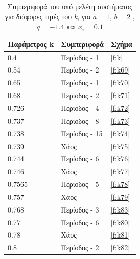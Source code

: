 \begin{table}[ht]
	\centering
	\caption{ Συμπεριφορά του υπό μελέτη συστήματος για διάφορες τιμές του \emph{k}, για $a = 1$, $b = 2$ , $q=-1.4$ και
		\(x_i=0.1\)}
	\label{tab:abc6}
	\begin{tabular}{l | l | l}
		Παράμετρος k & Συμπεριφορά & Σχήμα\\
		\hline
		0.4 &  Περίοδος -  1 & \ref{f:k}\\
		0.54 &  Περίοδος -  2 & \ref{f:k69}\\
		0.65& Περίοδος -  1 & \ref{f:k70}\\
		0.68& Περίοδος -  2 & \ref{f:k71}\\
		0.726 &  Περίοδος -  4 & \ref{f:k72}\\
		0.737& Περίοδος -  8 & \ref{f:k73}\\
		0.738& Περίοδος -  15 & \ref{f:k74}\\
		0.739& Χάος & \ref{f:k75}\\
		0.744 &  Περίοδος -  6 & \ref{f:k76}\\
		0.746 &  Χάος & \ref{f:k77}\\
		0.7565 &  Περίοδος -  5 & \ref{f:k78}\\
		0.757 &  Χάος & \ref{f:k79}\\
		0.768 &  Περίοδος -  3 & \ref{f:k83}\\
		0.77 &  Περίοδος -  6 & \ref{f:k80}\\
		0.78 &  Χάος & \ref{f:k81}\\
		0.8 & Περίοδος -  2&\ref{f:k82}\\
	\end{tabular}
\end{table}

